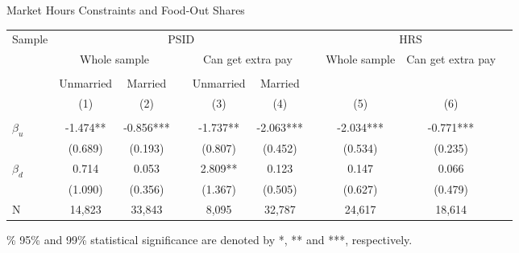 \newpage
\begin{center}
\begin{threeparttable}
\caption{Market Hours Constraints and Food-Out Shares } \label{HRS}
\begin{footnotesize}
\begin{tabular}{lccccccccc}
\hline \hline
Sample            &\multicolumn{5}{c}{PSID}           &&\multicolumn{2}{c}{HRS}  \\[1ex]
\cline{2-6}\cline{8-9}
                     & \multicolumn{2}{c}{Whole sample}  && \multicolumn{2}{c}{Can get extra pay} && Whole sample & Can get extra pay \\
\hline \\[-1ex]
                     &Unmarried          & Married       &&Unmarried        & Married             &&              &         \\
                     &(1)                &(2)            &&(3)              &(4)                  &&(5)           &(6)            \\
\hline \\
$\beta_u$            &      -1.474** &      -0.856***&&      -1.737** &      -2.063***&&      -2.034***&      -0.771***\\
                     &     (0.689)   &     (0.193)   &&     (0.807)   &     (0.452)   &&     (0.534)   &     (0.235)   \\
$\beta_d$            &       0.714   &       0.053   &&       2.809** &       0.123   &&       0.147   &       0.066   \\
                     &     (1.090)   &     (0.356)   &&     (1.367)   &     (0.505)   &&     (0.627)   &     (0.479)   \\
N                    &       14,823  &       33,843  &&        8,095  &       32,787  &&       24,617  &       18,614  \\
\hline\hline
\end{tabular}
\end{footnotesize}
\begin{tablenotes}
\item[] \footnotesize{\% 95\% and 99\% statistical
significance are denoted by *, ** and ***, respectively.}
\end{tablenotes}
\end{threeparttable}
\end{center}













